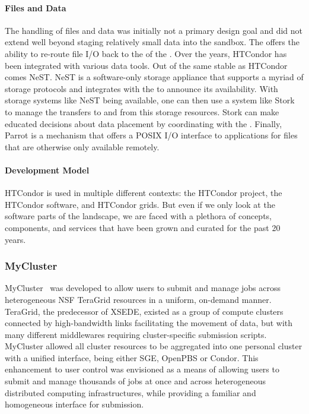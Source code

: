 \documentclass{sig-alternate}
\begin{document}
\paragraph{Files and Data}

The handling of files and data was initially not a primary design goal and did
not extend well beyond staging relatively small data into the sandbox. The
 offers the ability to re-route file I/O back to the
 of the . Over the years, HTCondor has been
integrated with various data tools. Out of the same stable as HTCondor comes
NeST\cite{}. NeST is a
software-only storage appliance that supports a myriad of storage protocols and
integrates with the  to announce its availability. With
storage systems like NeST being available, one can then use a system like
Stork\cite{} to manage the transfers to and from this storage resources. Stork
can make educated decisions about data placement by coordinating with the
. Finally, Parrot\cite{} is a mechanism that offers a POSIX
I/O interface to applications for files that are otherwise only available
remotely.


\paragraph{Development Model}

HTCondor is used in multiple different contexts: the HTCondor project, the
HTCondor software, and HTCondor grids. But even if we only look at the software
parts of the landscape, we are faced with a plethora of concepts, components,
and services that have been grown and curated for the past 20 years.

%
%
\subsubsection{MyCluster}
\label{sec:mycluster}

MyCluster~\cite{1652061} was developed to allow users to submit and manage jobs
across heterogeneous NSF TeraGrid resources in a uniform, on-demand manner.
TeraGrid, the predecessor of XSEDE, existed as a group of compute clusters
connected by high-bandwidth links facilitating the movement of data, but with
many different middlewares requiring cluster-specific submission scripts.
MyCluster allowed all cluster resources to be aggregated into one personal
cluster with a unified interface, being either SGE, OpenPBS or Condor. This
enhancement to user control was envisioned as a means of allowing users to
submit and manage thousands of jobs at once and across heterogeneous
distributed computing infrastructures, while providing a familiar and
homogeneous interface for submission.
\end{document}
